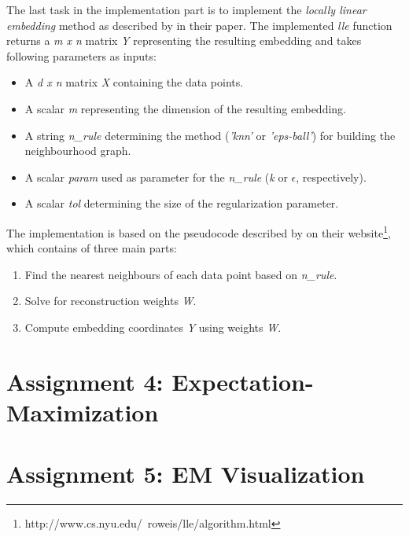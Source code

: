 The last task in the implementation part is to implement the \textit{locally linear embedding} method as described by  in their paper. The implemented \textit{lle} function returns a \textit{m x n} matrix \textit{Y} representing the resulting embedding and takes following parameters as inputs:
\begin{itemize}
	\item A \textit{d x n} matrix \textit{X} containing the data points.
	\item A scalar \textit{m} representing the dimension of the resulting embedding.
	\item A string \textit{n\_rule} determining the method (\textit{'knn'} or \textit{'eps-ball'}) for building the neighbourhood graph.
	\item A scalar \textit{param} used as parameter for the \textit{n\_rule} (\textit{k} or $\epsilon$, respectively).
	\item A scalar \textit{tol} determining the size of the regularization parameter.
\end{itemize}

The implementation is based on the pseudocode described by  on their website\footnote{http://www.cs.nyu.edu/~roweis/lle/algorithm.html}, which contains of three main parts:
\begin{enumerate}
	\item Find the nearest neighbours of each data point based on \textit{n\_rule}.
	\item Solve for reconstruction weights \textit{W}.
	\item Compute embedding coordinates \textit{Y} using weights \textit{W}.
\end{enumerate}


\section{Assignment 4: Expectation-Maximization}
\label{sec:assignment4}

\section{Assignment 5: EM Visualization}
\label{sec:assignment5}